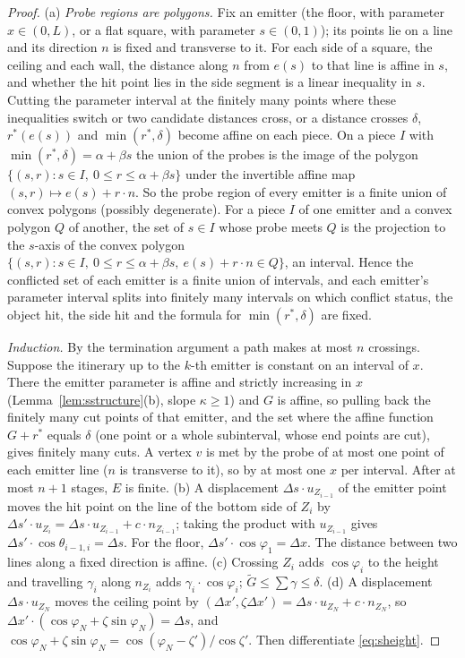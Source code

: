 \documentclass[11pt,letterpaper]{amsart}
\theoremstyle{plain}
\theoremstyle{definition}
\theoremstyle{remark}
\begin{document}
\begin{proof}
(a) \emph{Probe regions are polygons.} Fix an emitter (the floor, with parameter $x\in(0,L)$, or a flat square, with parameter $s\in(0,1)$); its points lie on a line and its direction $n$ is fixed and transverse to it. For each side of a square, the ceiling and each wall, the distance along $n$ from $e(s)$ to that line is affine in $s$, and whether the hit point lies in the side segment is a linear inequality in $s$. Cutting the parameter interval at the finitely many points where these inequalities switch or two candidate distances cross, or a distance crosses $\delta$, $r^*(e(s))$ and $\min(r^*,\delta)$ become affine on each piece. On a piece $I$ with $\min(r^*,\delta)=\alpha+\beta s$ the union of the probes is the image of the polygon $\{(s,r):s\in I,\ 0\le r\le\alpha+\beta s\}$ under the invertible affine map $(s,r)\mapsto e(s)+r\cdot n$. So the probe region of every emitter is a finite union of convex polygons (possibly degenerate). For a piece $I$ of one emitter and a convex polygon $Q$ of another, the set of $s\in I$ whose probe meets $Q$ is the projection to the $s$-axis of the convex polygon $\{(s,r):s\in I,\ 0\le r\le\alpha+\beta s,\ e(s)+r\cdot n\in Q\}$, an interval. Hence the conflicted set of each emitter is a finite union of intervals, and each emitter's parameter interval splits into finitely many intervals on which conflict status, the object hit, the side hit and the formula for $\min(r^*,\delta)$ are fixed.

\emph{Induction.} By the termination argument a path makes at most $n$ crossings. Suppose the itinerary up to the $k$-th emitter is constant on an interval of $x$. There the emitter parameter is affine and strictly increasing in $x$ (Lemma~\ref{lem:sstructure}(b), slope $\kappa\ge1$) and $G$ is affine, so pulling back the finitely many cut points of that emitter, and the set where the affine function $G+r^*$ equals $\delta$ (one point or a whole subinterval, whose end points are cut), gives finitely many cuts. A vertex $v$ is met by the probe of at most one point of each emitter line ($n$ is transverse to it), so by at most one $x$ per interval. After at most $n+1$ stages, $E$ is finite. (b) A displacement $\Delta s\cdot u_{Z_{i-1}}$ of the emitter point moves the hit point on the line of the bottom side of $Z_i$ by $\Delta s'\cdot u_{Z_i}=\Delta s\cdot u_{Z_{i-1}}+c\cdot n_{Z_{i-1}}$; taking the product with $u_{Z_{i-1}}$ gives $\Delta s'\cdot\cos\theta_{i-1,i}=\Delta s$. For the floor, $\Delta s'\cdot\cos\varphi_1=\Delta x$. The distance between two lines along a fixed direction is affine. (c) Crossing $Z_i$ adds $\cos\varphi_i$ to the height and travelling $\gamma_i$ along $n_{Z_i}$ adds $\gamma_i\cdot\cos\varphi_i$; $\widetilde G\le\sum\gamma\le\delta$. (d) A displacement $\Delta s\cdot u_{Z_N}$ moves the ceiling point by $(\Delta x',\zeta\Delta x')=\Delta s\cdot u_{Z_N}+c\cdot n_{Z_N}$, so $\Delta x'\cdot(\cos\varphi_N+\zeta\sin\varphi_N)=\Delta s$, and $\cos\varphi_N+\zeta\sin\varphi_N=\cos(\varphi_N-\zeta')/\cos\zeta'$. Then differentiate \eqref{eq:sheight}.
\end{proof}
\end{document}

